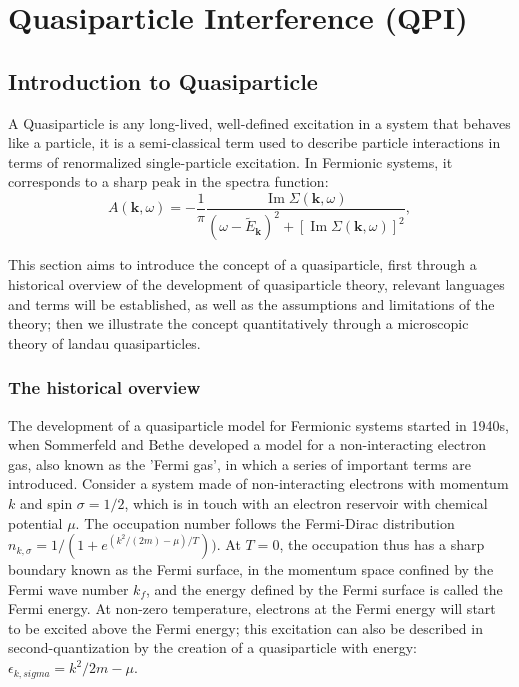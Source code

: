 \chapter{Quasiparticle Interference (QPI)}
\section{Introduction to Quasiparticle}
A Quasiparticle is any long-lived, well-defined excitation in a system that behaves like a particle, it is a semi-classical term used to describe particle interactions in terms of renormalized single-particle excitation. In Fermionic systems, it corresponds to a sharp peak in the spectra function: 
	\[
	A(\mathbf{k}, \omega) = -\frac{1}{\pi} \frac{\operatorname{Im} \Sigma(\mathbf{k}, \omega)}{(\omega - \tilde{E}_{\mathbf{k}})^2 + [\operatorname{Im} \Sigma(\mathbf{k}, \omega)]^2},
	\]

This section aims to introduce the concept of a quasiparticle, first through a historical overview of the development of quasiparticle theory, relevant languages and terms will be established, as well as the assumptions and limitations of the theory; then we illustrate the concept quantitatively through a microscopic theory of landau quasiparticles. 

\subsection{The historical overview}
The development of a quasiparticle model for Fermionic systems started in 1940s, when Sommerfeld and Bethe\cite{SommerfeldBethe1933} developed a model for a non-interacting electron gas, also known as the 'Fermi gas', in which a series of important terms are introduced. Consider a system made of non-interacting electrons with momentum $k$ and spin $\sigma = 1/2$, which is in touch with an electron reservoir with chemical potential $\mu$. The occupation number follows the Fermi-Dirac distribution $n_{k,\sigma}=1/(1+e^{(k^2/(2m)-\mu)/T}))$. At $T=0$, the occupation thus has a sharp boundary known as the Fermi surface, in the momentum space confined by the Fermi wave number $k_f$, and the energy defined by the Fermi surface is called the Fermi energy. At non-zero temperature, electrons at the Fermi energy will start to be excited above the Fermi energy; this excitation can also be described in second-quantization by the creation of a quasiparticle with energy: $\epsilon_{k,sigma} = k^2/2m - \mu$. 

